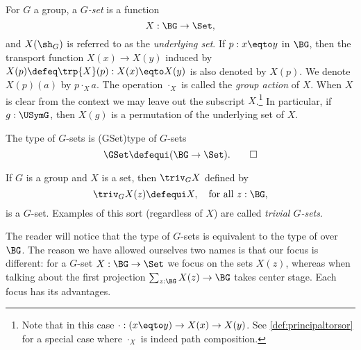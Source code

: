 
\begin{definition}\label{def:Gset}
  For $G$ a group, a \emph{$G$-set} is a function
  \[
    X : \BG\to\Set,
  \]
  and $X(\sh_G)$ is referred to as the \emph{underlying set}.
  If $p:x\eqto y$ in $\BG$,
  then the transport function $X(x)\to X(y)$ induced
  by $X(p)\defeq\trp{X}(p) : X(x)\eqto X(y)$ is also denoted by $X(p)$.
  We denote $X(p)(a)$ by $p\cdot_X a$.
  The operation $\cdot_X$ is called the \emph{group action} of $X$.
  When $X$ is clear from the context we may leave out the
  subscript $X$.\footnote{%
    Note that in this case $\cdot: (x\eqto y) \to X(x) \to X(y)$.
    See \cref{def:principaltorsor} for a special case
    where $\cdot_X$ is indeed path composition.}
  In particular, if $g:\USymG$,
  then $X(g)$ is a permutation of the underlying set of $X$.

  The type of $G$-sets is
  \glossary(GSet){\protect{$\GSet$}}{type of $G$-sets}
  \[
    \GSet\defequi(\BG\to\Set).\qedhere
  \]
\end{definition}

\begin{example}\label{def:trivGset}
  If $G$ is a group and $X$ is a set, then $\triv_G X$ defined by
  \[\triv_G X(z)\defequi X, \quad\text{for all $z:\BG$,}\]
  is a $G$-set.
  Examples of this sort (regardless of $X$) are called \emph{trivial $G$-sets}.
\end{example}
\begin{remark}
  \label{rem:G-set-vs-set-bundle}
The reader will notice that the type of $G$-sets is equivalent to the
type of \coverings over $\BG$.
The reason we have allowed ourselves two names is that our focus is different: for a $G$-set $X:\BG\to\Set$ we focus on the sets $X(z)$, whereas when talking about \coverings the first projection $\sum_{z:\BG}X(z)\to \BG$ takes center stage.  Each focus has its advantages.
\end{remark}

